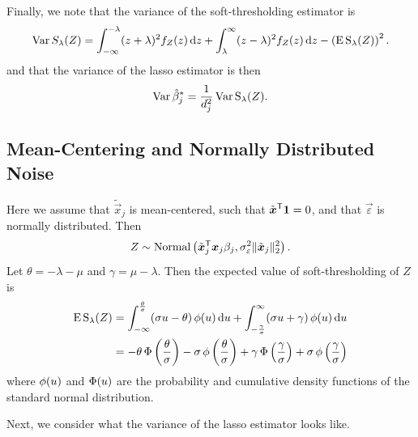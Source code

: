 Finally, we note that the variance of the soft-thresholding estimator is
\begin{equation}
  \label{eq:st-variance}
  \operatorname{Var} {S_\lambda(Z)} = \int_{-\infty}^{-\lambda}(z + \lambda)^2f_Z(z) \mathop{}\!\mathrm{d} z + \int_{\lambda}^\infty (z - \lambda)^2 f_Z(z) \mathop{}\!\mathrm{d} z - \left(\operatorname{E} \operatorname{S}_\lambda(Z)\right)^2.
\end{equation}
and that the variance of the lasso estimator is then
\begin{equation}
  \label{eq:betahat-variance}
  \operatorname{Var} \hat\beta_j^* = \frac{1}{d_j^2} \operatorname{Var} \operatorname{S}_\lambda(Z).
\end{equation}

\subsection{Mean-Centering and Normally Distributed Noise}

Here we assume that \(\tilde{\vec{x}}_j\) is mean-centered, such that \(\tilde{\boldsymbol{x}}^{\mathsf{T}} \boldsymbol{1} = 0\), and that \(\vec{\varepsilon}\) is normally distributed. Then
\[
  Z \sim \operatorname{Normal}\left(\tilde{\boldsymbol{x}}_j^{\mathsf{T}}\boldsymbol{x}_j \beta_j, \sigma_\varepsilon^2 \lVert \tilde{\boldsymbol{x}}_j\rVert_2^2 \right).
\]
Let \(\theta = -\lambda - \mu\) and \(\gamma = \mu - \lambda\). Then the expected value of soft-thresholding of \(Z\) is
\begin{align}
  \operatorname{E} \operatorname{S}_\lambda(Z) & = \int_{-\infty}^\frac{\theta}{\sigma} (\sigma u - \theta) \operatorname{\phi}(u) \mathop{}\!\mathrm{d} u + \int_{-\frac{\gamma}{\sigma}}^\infty (\sigma u + \gamma) \operatorname{\phi}(u) \mathop{}\!\mathrm{d} u                                               \nonumber                      \\
                    & = -\theta \operatorname{\Phi}\left(\frac{\theta}{\sigma}\right) - \sigma \operatorname{\phi}\left(\frac{\theta}{\sigma}\right) + \gamma \operatorname{\Phi}\left(\frac{\gamma}{\sigma}\right) + \sigma \operatorname{\phi}\left(\frac{\gamma}{\sigma}\right) \label{eq:mean-centered-eval}
\end{align}
where \(\operatorname{\phi}(u)\) and \(\operatorname{\Phi}(u)\) are the probability and cumulative density functions of the standard normal distribution.

Next, we consider what the variance of the lasso estimator looks like.

